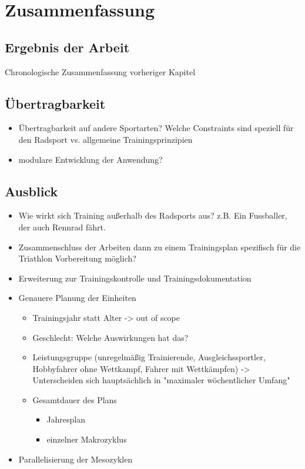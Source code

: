 \chapter{Zusammenfassung}
\label{sec:zusammenfassung}
\section{Ergebnis der Arbeit}
\label{sec:zusammenfassung:ergebnis}
Chronologische Zusammenfassung vorheriger Kapitel

\section{Übertragbarkeit}
\begin{itemize}
    \item Übertragbarkeit auf andere Sportarten? Welche Constraints sind speziell für den Radsport vs. allgemeine Trainingsprinzipien
    \item modulare Entwicklung der Anwendung?
\end{itemize}

\section{Ausblick}
\label{sec:zusammenfassung:ausblick}
\begin{itemize}
    \item Wie wirkt sich Training außerhalb des Radsports aus? z.B. Ein Fussballer, der auch Rennrad fährt.
    \item Zusammenschluss der Arbeiten dann zu einem Trainingsplan spezifisch für die Triathlon Vorbereitung möglich?
    \item Erweiterung zur Trainingskontrolle und Trainingsdokumentation
    \item Genauere Planung der Einheiten
    \begin{itemize}
        \item Trainingsjahr statt Alter -> out of scope \cite[181]{EinfuerungTrainingswissenschaft}
        \item Geschlecht: Welche Auswirkungen hat das?
        \item Leistungsgruppe \cite[S. 173]{Radsporttraining} (unregelmäßig Trainierende, Ausgleichssportler, Hobbyfahrer ohne Wettkampf, Fahrer mit Wettkämpfen) -> Unterscheiden sich hauptsächlich in "maximaler wöchentlicher Umfang"
        \item Gesamtdauer des Plans
            \begin{itemize}
                \item Jahresplan
                \item einzelner Makrozyklus
            \end{itemize}
    \end{itemize}   
    \item Parallelisierung der Mesozyklen
\end{itemize}


